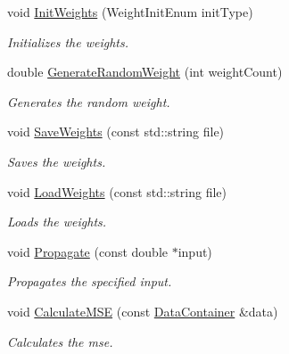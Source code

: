 \begin{DoxyCompactItemize}
void \hyperlink{class_n_n_t_lib_1_1_neural_network_a9c9aa74920e9b369d434256c6706e75a}{Init\+Weights} (Weight\+Init\+Enum init\+Type)
\begin{DoxyCompactList}\small\item\em Initializes the weights. \end{DoxyCompactList}\item 
double \hyperlink{class_n_n_t_lib_1_1_neural_network_aee9c78b90d25b0ebb1b3cb3cf732e4fc}{Generate\+Random\+Weight} (int weight\+Count)
\begin{DoxyCompactList}\small\item\em Generates the random weight. \end{DoxyCompactList}\item 
void \hyperlink{class_n_n_t_lib_1_1_neural_network_a4a85f90af22f14e8cce248d9b6e3516c}{Save\+Weights} (const std\+::string file)
\begin{DoxyCompactList}\small\item\em Saves the weights. \end{DoxyCompactList}\item 
void \hyperlink{class_n_n_t_lib_1_1_neural_network_a9c2f594b5aafa05970a47df983436540}{Load\+Weights} (const std\+::string file)
\begin{DoxyCompactList}\small\item\em Loads the weights. \end{DoxyCompactList}\item 
void \hyperlink{class_n_n_t_lib_1_1_neural_network_a86d77108c0d47b6e6dd33dccfef6521f}{Propagate} (const double $\ast$input)
\begin{DoxyCompactList}\small\item\em Propagates the specified input. \end{DoxyCompactList}\item 
void \hyperlink{class_n_n_t_lib_1_1_neural_network_a43e8b626150530fcb8e17aa957ef1d62}{Calculate\+M\+S\+E} (const \hyperlink{class_n_n_t_lib_1_1_data_container}{Data\+Container} \&data)
\begin{DoxyCompactList}\small\item\em Calculates the mse. \end{DoxyCompactList}\end{DoxyCompactItemize}
